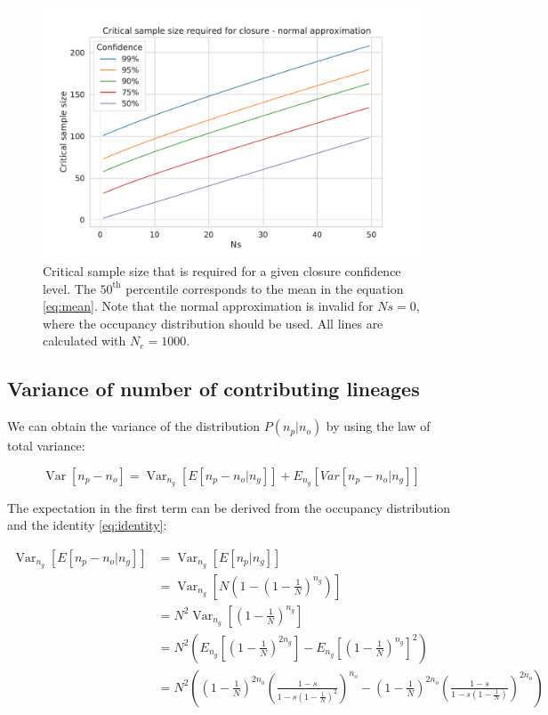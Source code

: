 \documentclass[review]{elsarticle}
\newcommand{\Var}{\operatorname{Var}}
\begin{document}
\begin{figure}
  \centering
  \includegraphics[width=\textwidth]{fig/critical_normal.pdf}
  \caption{Critical sample size that is required for a given closure confidence level. The $50^\text{th}$ percentile corresponds to the mean in the equation \eqref{eq:mean}. Note that the normal approximation is invalid for $Ns=0$, where the occupancy distribution should be used. All lines are calculated with $N_e=1000$.}
  \label{fig:apx:critical-normal}
\end{figure}

\subsection{Variance of number of contributing lineages}
\label{subsec:apx:variance}

We can obtain the variance of the distribution $P(n_p | n_o)$ by using the law of total variance:

\begin{equation}
  \label{eq:apx:var}
\Var\left[n_p-n_o \right] = \Var_{n_g}\left[E\left[n_p-n_o | n_g \right]\right]+  E_{n_g}\left[Var\left[n_p-n_o | n_g \right]\right] 
\end{equation}

The expectation in the first term can be derived from the occupancy distribution and the identity
\ref{eq:identity}:

\begin{equation}
\begin{split}
\Var_{n_g}\left[E\left[n_p-n_o | n_g \right]\right] &= \Var_{n_g}\left[E\left[n_p| n_g \right]\right] \\
&= \Var_{n_g}\left[N\left(1-(1-\frac{1}{N})^{n_g} \right) \right] \\ 
&= N^2 \Var_{n_g}\left[(1-\frac{1}{N})^{n_g} \right] \\
&= N^2 \left( E_{n_g}\left[(1-\frac{1}{N})^{2n_g} \right] - E_{n_g}\left[(1-\frac{1}{N})^{n_g} \right]^2\right) \\
&= N^2 \left( \left(1-\frac{1}{N}\right)^{2n_o} \left(\frac{1-s}{1-s  \left(1-\frac{1}{N}\right)^2}\right)^{n_o} 
-   \left(1-\frac{1}{N}\right)^{2n_o} \left(\frac{1-s}{1-s  \left(1-\frac{1}{N}\right)}\right)^{2n_o} \right) \\
\end{split}
\end{equation}
\end{document}
